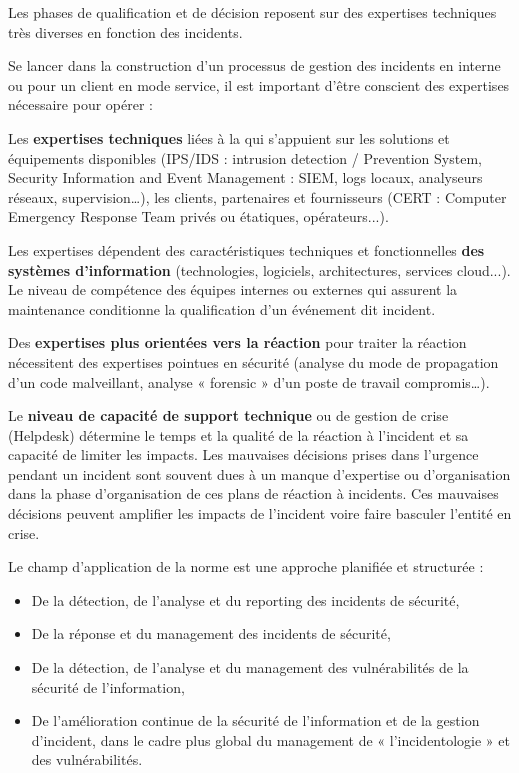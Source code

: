 Les phases de qualification et de décision reposent sur des expertises techniques très diverses en fonction des incidents.

Se lancer dans la construction d'un processus de gestion des incidents en interne ou pour un client en mode service, il est important d'être conscient des expertises nécessaire pour opérer :

Les \textbf{expertises techniques} liées à la \textbf{}qui s’appuient sur les solutions et équipements disponibles (IPS/IDS : intrusion detection / Prevention System, Security Information and Event Management : SIEM, logs locaux, analyseurs réseaux, supervision…), les clients,  partenaires et fournisseurs (CERT : Computer Emergency Response Team privés ou étatiques, opérateurs...).

Les expertises dépendent des caractéristiques techniques et fonctionnelles \textbf{des systèmes d’information} (technologies, logiciels, architectures, services cloud...). Le niveau de compétence des équipes internes ou externes qui assurent la maintenance conditionne la qualification  d’un événement dit incident. 

Des \textbf{expertises  plus orientées vers la réaction }pour traiter la réaction nécessitent des expertises pointues en sécurité (analyse du mode de propagation d’un code malveillant, analyse « forensic » d’un poste de travail  compromis…).

Le \textbf{niveau de capacité de support technique }ou de gestion de crise (Helpdesk) détermine le temps et la qualité de la réaction à l’incident et sa capacité de limiter les impacts. Les mauvaises décisions prises dans l’urgence pendant un incident sont souvent dues à un manque d’expertise ou d’organisation dans la phase d'organisation de ces plans de réaction à incidents. Ces mauvaises décisions peuvent amplifier les impacts de l’incident voire faire basculer l’entité en crise.

Le  champ d’application de la norme est une approche planifiée et structurée :
\begin{itemize}
  \item De la détection, de l'analyse et du reporting des incidents de sécurité,
  \item De la réponse et du management des incidents de sécurité,
  \item De la détection, de l’analyse et du management des vulnérabilités de la sécurité de l’information,
  \item De l’amélioration continue de la sécurité de l’information et de la gestion d’incident, dans le cadre plus global du management de « l’incidentologie » et des vulnérabilités.
\end{itemize}





